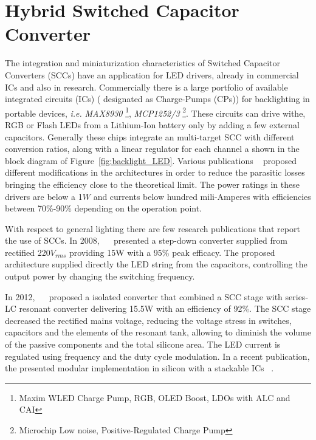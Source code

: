 \chapter{Hybrid Switched Capacitor Converter}

The integration and miniaturization characteristics of Switched Capacitor Converters (SCCs) have an application for LED drivers, already in  commercial ICs and also in research. Commercially there is a large portfolio of available integrated circuits (ICs) ( designated as Charge-Pumps (CPs))  for backlighting in portable devices, \emph{i.e.}  \emph{MAX8930} \footnote{Maxim\textsuperscript{\textregistered} WLED Charge Pump, RGB, OLED Boost, LDOs with ALC and CAI }, \emph{MCP1252/3} \footnote{Microchip\textsuperscript{\textregistered} Low noise, Positive-Regulated Charge Pump}. These circuits can drive withe, RGB or Flash LEDs from a Lithium-Ion battery only by adding a few external capacitors.  Generally these chips integrate an multi-target SCC with different conversion ratios, along with a linear regulator for each channel a shown in the block diagram of Figure~\ref{fig:backlight_LED}. Various publications ~\cite{07Feng,09Wu,10Yin} proposed different modifications in the architectures in order to reduce the parasitic losses bringing the efficiency close to the theoretical limit. The power ratings in these drivers are below a 1$W$ and currents below hundred mili-Amperes with efficiencies between 70\%-90\% depending on the operation point.



With respect to general lighting there are few research publications that report the use of SCCs. In 2008, ~\citeauthor{08Lee}~\cite{08Lee} presented a step-down converter supplied from rectified 220$V_{rms}$ providing 15W with a 95\% peak efficacy. The proposed architecture   supplied directly the LED string from the capacitors, controlling the output power by changing the switching frequency. 

In 2012, ~\citeauthor{2012Kline}~\cite{2012Kline} proposed a isolated converter that combined a SCC stage with series-LC resonant converter delivering 15.5W with an efficiency of  92\%.  The SCC stage decreased  the rectified mains voltage, reducing the voltage stress in switches, capacitors and the elements of the resonant tank, allowing to diminish  the volume of the passive components and the total silicone area. The LED current is regulated using frequency and the duty cycle modulation. In a recent publication, the  presented modular implementation in silicon with a stackable ICs ~\cite{2013Kline}.

